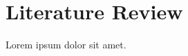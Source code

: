 \documentclass[11pt]{article}
\begin{document}

\section{Literature Review}
Lorem ipsum dolor sit amet.
\end{document}
